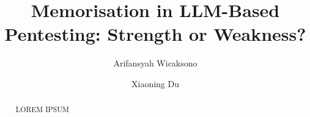 \documentclass[acmtog]{acmart}
\begin{document}
\title{Memorisation in LLM-Based Pentesting: Strength or Weakness?}

\author{Arifansyah Wicaksono}

\author{Xiaoning Du}


\renewcommand{\shortauthors}{Trovato et al.}

\begin{abstract}
  LOREM IPSUM
\end{abstract}

\end{document}
